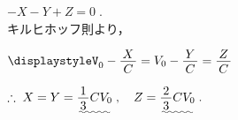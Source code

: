 ﻿\documentclass[../../../ps_a.tex]{subfiles}
\begin{document}
\begin{enumerate}
            \myspaceb%
            $\displaystyle%
                -X - Y + Z = 0 \;.
            $\\
            キルヒホッフ則より，
            
            \myspaceb%
            $\displaystyle%
                V_0 - \myfraca{X}{C} = V_0 - \myfraca{Y}{C} = \myfraca{Z}{C}
            $

            \myspaceb%
            $\displaystyle%
                \therefore \; X = Y = \uwave{\myfraca{1}{3}CV_0} \;,%
                \quad Z = \uwave{\myfraca{2}{3}CV_0} \;.
            $
    \end{enumerate}
\end{document}
